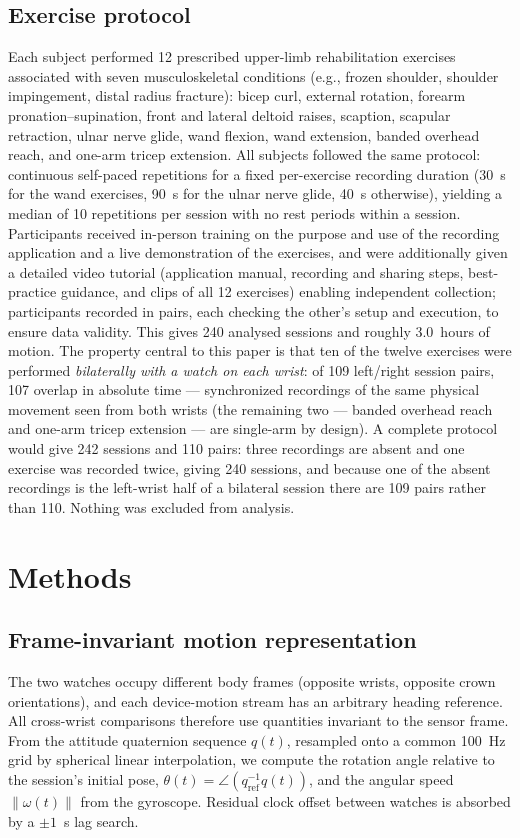 \documentclass[conference]{IEEEtran}
\begin{document}
\subsection{Exercise protocol}
Each subject performed 12 prescribed upper-limb rehabilitation
exercises associated with seven musculoskeletal conditions (e.g.,
frozen shoulder, shoulder impingement, distal radius fracture): bicep
curl, external rotation, forearm pronation--supination, front and
lateral deltoid raises, scaption, scapular retraction, ulnar nerve
glide, wand flexion, wand extension, banded overhead reach, and
one-arm tricep extension. All subjects followed the same protocol:
continuous self-paced repetitions for a fixed per-exercise recording
duration (30~s for the wand exercises, 90~s for the ulnar nerve
glide, 40~s otherwise), yielding a median of 10 repetitions per
session with no rest periods within a session. Participants received
in-person training on the purpose and use of the recording application
and a live demonstration of the exercises, and were additionally given
a detailed video tutorial (application manual, recording and sharing
steps, best-practice guidance, and clips of all 12 exercises) enabling
independent collection; participants recorded in pairs, each
checking the other's setup and execution, to ensure data validity. This gives 240 analysed sessions and roughly 3.0~hours
of motion. The property
central to this paper is that ten of the twelve exercises were
performed \emph{bilaterally with a watch on each wrist}: of 109
left/right session pairs, 107 overlap in absolute time --- synchronized
recordings of the same physical movement seen from both wrists (the
remaining two --- banded overhead reach and one-arm tricep extension
--- are single-arm by design). A complete protocol would give 242
sessions and 110 pairs: three recordings are absent and one exercise
was recorded twice, giving 240 sessions, and because one of the absent
recordings is the left-wrist half of a bilateral session there are 109
pairs rather than 110. Nothing was excluded from analysis.

\section{Methods}

\subsection{Frame-invariant motion representation}
The two watches occupy different body frames (opposite wrists,
opposite crown orientations), and each device-motion stream has an
arbitrary heading reference. All cross-wrist comparisons therefore use
quantities invariant to the sensor frame. From the attitude
quaternion sequence $q(t)$, resampled onto a common 100~Hz grid by
spherical linear interpolation, we compute the rotation angle relative
to the session's initial pose,
$\theta(t) = \angle\!\left(q_{\mathrm{ref}}^{-1} q(t)\right)$,
and the angular speed $\|\omega(t)\|$ from the gyroscope. Residual
clock offset between watches is absorbed by a $\pm 1$~s lag search.
\end{document}
